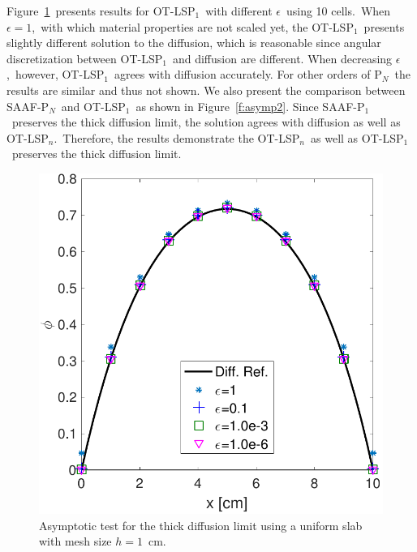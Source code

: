 \documentclass[review]{elsarticle}
\newcommand{\pn}{P$_N$}
\newcommand{\pp}[1]{P$_{#1}$}
\begin{document}
Figure\ \ref{f:asymp}\ presents results for OT-LS\pp{1}\ with different $\epsilon$\ using 10 cells.\ When $\epsilon=1$,\ with which material properties are not scaled yet, the OT-LS\pp{1}\ presents slightly different solution to the diffusion, which is reasonable since angular discretization between OT-LS\pp{1}\ and diffusion are different. When decreasing $\epsilon$,\ however, OT-LS\pp{1}\ agrees with diffusion accurately. For other orders of \pn\ the results are similar and thus not shown. We also present the comparison between SAAF-\pn\ and OT-LS\pp{1}\ as shown in Figure\ \ref{f:asymp2}. Since SAAF-\pp{1}\ preserves the thick diffusion limit, the solution agrees with diffusion as well as OT-LS\pp{n}.\ Therefore, the results demonstrate the OT-LS\pp{n}\ as well as OT-LS\pp{1}\ preserves the thick diffusion limit.
\begin{figure}[ht!]
	
	\centering
	\includegraphics[width=.75\linewidth]{PHY_DIF.pdf}
	\caption{Asymptotic test for the thick diffusion limit using a uniform slab {with mesh size $h=1$\ cm}.}
	\label{f:asymp}
	
\end{figure}
\end{document}
